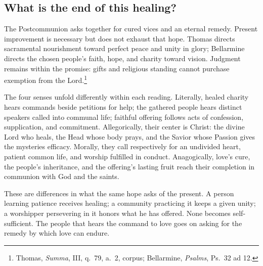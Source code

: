 \subsection{What is the end of this healing?}

The Postcommunion asks together for cured vices and an eternal remedy. Present improvement is necessary but does not exhaust that hope. Thomas directs sacramental nourishment toward perfect peace and unity in glory; Bellarmine directs the chosen people's faith, hope, and charity toward vision. Judgment remains within the promise: gifts and religious standing cannot purchase exemption from the Lord.\footnote{Thomas, \textit{Summa}, III, q.~79, a.~2, corpus; Bellarmine, \textit{Psalms}, Ps.~32 ad 12.}

The four senses unfold differently within each reading. Literally, healed charity hears commands beside petitions for help; the gathered people hears distinct speakers called into communal life; faithful offering follows acts of confession, supplication, and commitment. Allegorically, their center is Christ: the divine Lord who heals, the Head whose body prays, and the Savior whose Passion gives the mysteries efficacy. Morally, they call respectively for an undivided heart, patient common life, and worship fulfilled in conduct. Anagogically, love's cure, the people's inheritance, and the offering's lasting fruit reach their completion in communion with God and the saints.

These are differences in what the same hope asks of the present. A person learning patience receives healing; a community practicing it keeps a given unity; a worshipper persevering in it honors what he has offered. None becomes self-sufficient. The people that hears the command to love goes on asking for the remedy by which love can endure.

